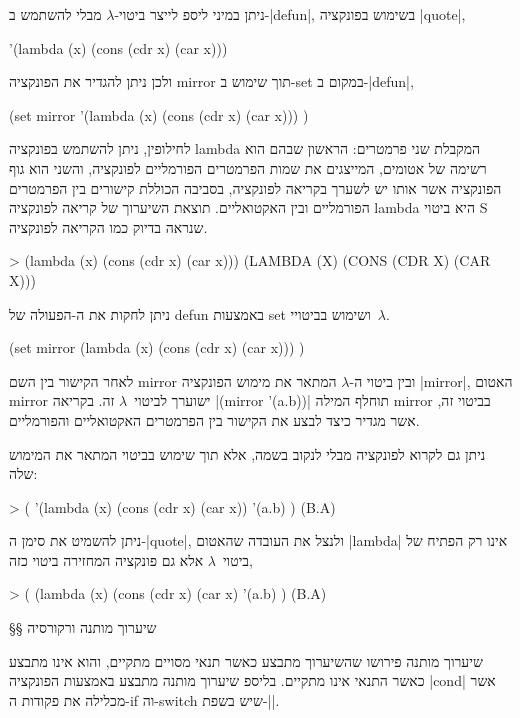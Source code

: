 ניתן במיני ליספ לייצר ביטוי-$λ$ מבלי להשתמש ב-\E|defun|, בשימוש בפונקציה
\E|quote|,
\begin{LISP}
  '(lambda (x) (cons (cdr x) (car x)))
\end{LISP}
ולכן ניתן להגדיר את הפונקציה mirror תוך שימוש ב-set במקום ב-\E|defun|,
\begin{LISP}
(set mirror
  '(lambda (x)
      (cons (cdr x) (car x)))
)
\end{LISP}
לחילופין, ניתן להשתמש בפונקציה lambda המקבלת שני פרמטרים: הראשון שבהם הוא רשימה
של אטומים, המייצגים את שמות הפרמטרים הפורמליים לפונקציה, והשני הוא גוף הפונקציה
אשר אותו יש לשערך בקריאה לפונקציה, בסביבה הכוללת קישורים בין הפרמטרים הפורמליים
ובין האקטואליים. תוצאת השיערוך של קריאה לפונקציה lambda היא ביטוי S שנראה
בדיוק כמו הקריאה לפונקציה.
\begin{LISP}
> (lambda (x) (cons (cdr x) (car x)))
(LAMBDA (X) (CONS (CDR X) (CAR X)))
\end{LISP}
ניתן לחקות את ה-הפעולה של defun באמצעות set ושימוש בביטויי~$λ$.
\begin{LISP}
(set
  mirror
  (lambda (x) (cons (cdr x) (car x)))
)
\end{LISP}
לאחר הקישור בין השם mirror ובין ביטוי ה-$λ$ המתאר את מימוש הפונקציה \E|mirror|,
האטום mirror ישוערך לביטוי~$λ$ זה. בקריאה \T|(mirror '(a.b))| תוחלף המילה
mirror בביטוי זה, אשר מגדיר כיצד לבצע את הקישור בין הפרמטרים האקטואליים
והפורמליים.

ניתן גם לקרוא לפונקציה מבלי לנקוב בשמה, אלא תוך שימוש בביטוי המתאר את המימוש
שלה:
\pagebreak[3]
\begin{LISP}
> (
    '(lambda (x)
      (cons (cdr x) (car x))
    '(a.b)
)
(B.A)
\end{LISP}
ניתן להשמיט את סימן ה-\E|quote|, ולנצל את העובדה שהאטום \T|lambda| אינו רק
הפתיח של ביטוי~$λ$ אלא גם פונקציה המחזירה ביטוי כזה,
\begin{LISP}
> (
    (lambda (x) (cons (cdr x) (car x)
    '(a.b)
)
(B.A)
\end{LISP}

§§ שיערוך מותנה ורקורסיה

שיערוך מותנה פירושו שהשיערוך מתבצע כאשר תנאי מסויים מתקיים, והוא אינו מתבצע
כאשר התנאי אינו מתקיים. בליספ שיערוך מותנה מתבצע באמצעות הפונקציה \E|cond|
אשר מכלילה את פקודות ה-if וה-switch שיש בשפת-\E|\CPL|.

